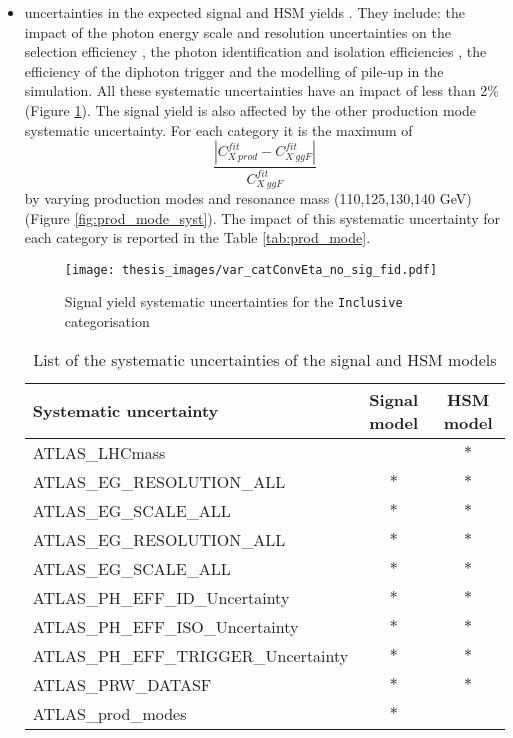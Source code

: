 \documentclass[a4paper, oneside, 11pt, openright]{book}
\begin{document}
\begin{itemize}
 					\item uncertainties in the expected signal and HSM yields . They include: the impact of the photon energy scale and resolution uncertainties on the selection efficiency \cite{Aad_2019}, the photon identification and isolation efficiencies \cite{Aad_2019}, the efficiency of the diphoton trigger \cite{e_trigger} and the modelling of pile-up in the simulation. All these systematic uncertainties have an impact  of less than 2\% (Figure \ref{fig:yield_syst}). The signal yield is also affected by  the other production mode systematic uncertainty. For each category it is the maximum of  $$\dfrac{|C^{fit}_{X\ prod}-C^{fit}_{X\ ggF}|}{C^{fit}_{X\ ggF}}$$ by varying production modes and resonance mass (110,125,130,140 GeV) (Figure \ref{fig:prod_mode_syst}). The impact of this systematic uncertainty for each category is reported in the Table \ref{tab:prod_mode}.
 					\begin{figure}
 						\centering
 						\texttt{[image: thesis\_images/var\_catConvEta\_no\_sig\_fid.pdf]}
 						\caption{Signal yield systematic uncertainties for the \texttt{Inclusive} categorisation}
 						\label{fig:yield_syst}
 					\end{figure}
 					\begin{center}
 						\begin{table}[tbp]
 							\centering
 							\begin{tabular}{lcc}
 								\toprule[1.5pt]
 								Systematic uncertainty					& Signal model	& HSM model	\\
 								\midrule
 								ATLAS\_LHCmass							& 				& $\ast$	\\
 								ATLAS\_EG\_RESOLUTION\_ALL				& $\ast$		& $\ast$	\\
 								ATLAS\_EG\_SCALE\_ALL					& $\ast$		& $\ast$	\\
 								\midrule
 								ATLAS\_EG\_RESOLUTION\_ALL				& $\ast$		& $\ast$	\\
 								ATLAS\_EG\_SCALE\_ALL					& $\ast$		& $\ast$	\\
 								ATLAS\_PH\_EFF\_ID\_Uncertainty			& $\ast$		& $\ast$	\\
 								ATLAS\_PH\_EFF\_ISO\_Uncertainty		& $\ast$		& $\ast$	\\
 								ATLAS\_PH\_EFF\_TRIGGER\_Uncertainty	& $\ast$		& $\ast$	\\
 								ATLAS\_PRW\_DATASF						& $\ast$		& $\ast$	\\
 								ATLAS\_prod\_modes						& $\ast$		& 			\\
 								\bottomrule[1.5pt]
 							\end{tabular}
 							\caption{List of the systematic uncertainties of the signal and HSM models}
 							\label{tab:sig_HSM_syst}
 						\end{table}
 					\end{center}
 				

\end{itemize}
\end{document}
